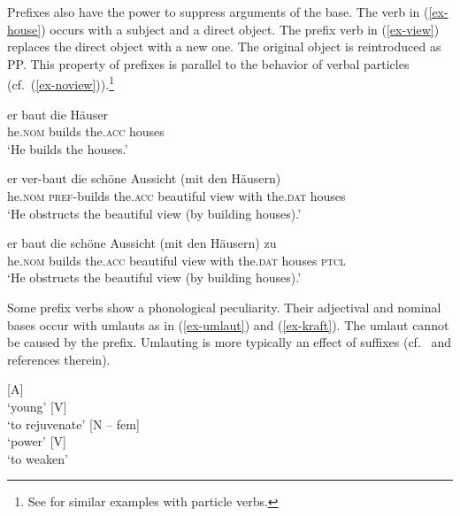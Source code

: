 \documentclass[output=paper
  ,nobabel
  ,draftmode
  ,colorlinks, citecolor=brown
]{langscibook}
\begin{document}
\noindent Prefixes also have the power to suppress arguments of the base. The verb in (\ref{ex-house}) occurs with a subject and a direct object. The prefix verb in (\ref{ex-view}) replaces the direct object with a new one. The original object is reintroduced as PP. This property of prefixes is parallel to the behavior of verbal particles (cf.\ (\ref{ex-noview})).\footnote{See \citet{Hoekstra1988} for similar examples with  particle verbs.}

\eal
\ex\label{ex-house}
\gll er baut die Häuser \\
	he.\textsc{nom} builds the.\textsc{acc} houses\\
\glt	`He builds the houses.'

\ex\label{ex-view}
\gll er ver-baut die schöne Aussicht (mit den Häusern) \\
	he.\textsc{nom} \textsc{pref}-builds the.\textsc{acc} beautiful view with   the.\textsc{dat}   houses \\
\glt `He obstructs the beautiful view (by building houses).'

\ex\label{ex-noview}
\gll er              baut   die            schöne      Aussicht    (mit    den           Häusern)   zu\\
	he.\textsc{nom}   builds   the.\textsc{acc}   beautiful   view           with the.\textsc{dat} houses \textsc{ptcl} \\
\glt	`He obstructs the beautiful view (by building houses).'
\zl

\noindent 
Some prefix verbs show a phonological peculiarity. Their adjectival and nominal bases occur with
umlauts as in (\ref{ex-umlaut}) and (\ref{ex-kraft}). The umlaut cannot be caused by the
prefix. Umlauting is more typically an effect of suffixes (cf.\ \citealt[101]{Eschenlohr1999} and references therein).

\begin{exe}
\ex
  \begin{xlist}
\label{ex-umlaut}
\ex\label{jüng}  [A]\\`young'
\ex {} [V]\\`to rejuvenate'
\zl
\eal 
\label{ex-kraft}
\ex{} [N -- fem]\\`power'
\ex {} [V]\\`to weaken'
\end{xlist}
\end{exe}
\end{document}

